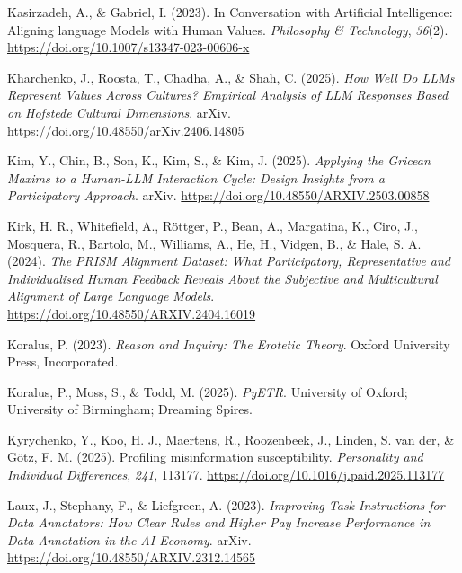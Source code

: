 \documentclass[
  12pt,
]{article}
\newlength{\cslhangindent}
\newenvironment{CSLReferences}[2] %
 {\begin{list}{}{%
  \setlength{\itemindent}{0pt}
  \setlength{\leftmargin}{0pt}
  \setlength{\parsep}{0pt}
  \ifodd #1
   \setlength{\leftmargin}{\cslhangindent}
   \setlength{\itemindent}{-1\cslhangindent}
  \fi
  \setlength{\itemsep}{#2\baselineskip}}}
 {\end{list}}
\begin{document}
\begin{CSLReferences}{1}{0}
Kasirzadeh, A., \& Gabriel, I. (2023). In {Conversation} with {Artificial} {Intelligence}: {Aligning} language {Models} with {Human} {Values}. \emph{Philosophy \& Technology}, \emph{36}(2). \url{https://doi.org/10.1007/s13347-023-00606-x}

Kharchenko, J., Roosta, T., Chadha, A., \& Shah, C. (2025). \emph{How {Well} {Do} {LLMs} {Represent} {Values} {Across} {Cultures}? {Empirical} {Analysis} of {LLM} {Responses} {Based} on {Hofstede} {Cultural} {Dimensions}}. arXiv. \url{https://doi.org/10.48550/arXiv.2406.14805}

Kim, Y., Chin, B., Son, K., Kim, S., \& Kim, J. (2025). \emph{Applying the {Gricean} {Maxims} to a {Human}-{LLM} {Interaction} {Cycle}: {Design} {Insights} from a {Participatory} {Approach}}. arXiv. \url{https://doi.org/10.48550/ARXIV.2503.00858}

Kirk, H. R., Whitefield, A., Röttger, P., Bean, A., Margatina, K., Ciro, J., Mosquera, R., Bartolo, M., Williams, A., He, H., Vidgen, B., \& Hale, S. A. (2024). \emph{The {PRISM} {Alignment} {Dataset}: {What} {Participatory}, {Representative} and {Individualised} {Human} {Feedback} {Reveals} {About} the {Subjective} and {Multicultural} {Alignment} of {Large} {Language} {Models}}. \url{https://doi.org/10.48550/ARXIV.2404.16019}

Koralus, P. (2023). \emph{Reason and {Inquiry}: {The} {Erotetic} {Theory}}. Oxford University Press, Incorporated.

Koralus, P., Moss, S., \& Todd, M. (2025). \emph{{PyETR}}. University of Oxford; University of Birmingham; Dreaming Spires.

Kyrychenko, Y., Koo, H. J., Maertens, R., Roozenbeek, J., Linden, S. van der, \& Götz, F. M. (2025). Profiling misinformation susceptibility. \emph{Personality and Individual Differences}, \emph{241}, 113177. \url{https://doi.org/10.1016/j.paid.2025.113177}

Laux, J., Stephany, F., \& Liefgreen, A. (2023). \emph{Improving {Task} {Instructions} for {Data} {Annotators}: {How} {Clear} {Rules} and {Higher} {Pay} {Increase} {Performance} in {Data} {Annotation} in the {AI} {Economy}}. arXiv. \url{https://doi.org/10.48550/ARXIV.2312.14565}


\end{CSLReferences}
\end{document}
